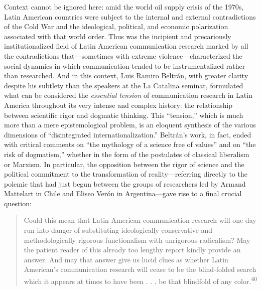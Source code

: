 \documentclass{tufte-handout}
\begin{document}
Context cannot be ignored here: amid the world oil supply crisis of the
1970s, Latin American countries were subject to the internal and
external contradictions of the Cold War and the ideological, political,
and economic polarization associated with that world order. Thus was the
incipient and precariously institutionalized field of Latin American
communication research marked by all the contradictions that---sometimes
with extreme violence---characterized the social dynamics in which
communication tended to be instrumentalized rather than researched. And
in this context, Luis Ramiro Beltrán, with greater clarity despite his
subtlety than the speakers at the La Catalina seminar, formulated what
can be considered the \emph{essential tension} of communication research
in Latin America throughout its very intense and complex history: the
relationship between scientific rigor and dogmatic thinking. This
``tension,'' which is much more than a mere epistemological problem, is
an eloquent synthesis of the various dimensions of ``disintegrated
internationalization.'' Beltrán's work, in fact, ended with critical
comments on ``the mythology of a science free of values'' and on ``the
risk of dogmatism,'' whether in the form of the postulates of classical
liberalism or Marxism. In particular, the opposition between the rigor
of science and the political commitment to the transformation of
reality---referring directly to the polemic that had just begun between
the groups of researchers led by Armand Mattelart in Chile and Eliseo
Verón in Argentina---gave rise to a final crucial question:

\begin{quote}
Could this mean that Latin American communication research will one day
run into danger of substituting ideologically conservative and
methodologically rigorous functionalism with unrigorous radicalism? May
the patient reader of this already too lengthy report kindly provide an
answer. And may that answer give us lucid clues as whether Latin
American's communication research will cease to be the blind-folded
search which it appears at times to have been . . . be that blindfold of
any color.\textsuperscript{40}
\end{quote}
\end{document}
